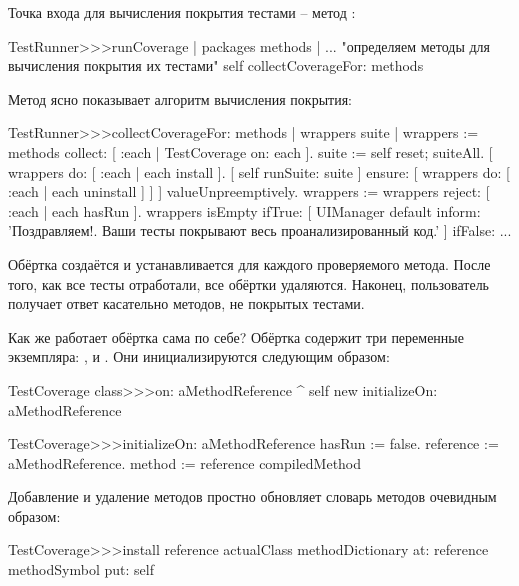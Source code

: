 \documentclass[a4paper,10pt,twoside]{book}
\begin{document}
{%
Точка входа для вычисления покрытия тестами -- метод :
\begin{code}{}
TestRunner>>>runCoverage
	| packages methods |
	... "определяем методы для вычисления покрытия их тестами"
	self collectCoverageFor: methods
\end{code}

Метод  ясно показывает алгоритм вычисления покрытия:
\begin{code}{}
TestRunner>>>collectCoverageFor: methods
	| wrappers suite |
	wrappers := methods collect: [ :each | TestCoverage on: each ].
	suite := self
		reset;
		suiteAll.
	[ wrappers do: [ :each | each install ].
	  [ self runSuite: suite ] ensure: [ wrappers do: [ :each | each uninstall ] ] ] valueUnpreemptively.
	wrappers := wrappers reject: [ :each | each hasRun ].
	wrappers isEmpty 
		ifTrue: 
			[ UIManager default inform: 'Поздравляем!. Ваши тесты покрывают весь проанализированный код.' ]
		ifFalse: ...
\end{code}
Обёртка создаётся и устанавливается для каждого проверяемого метода.
После того, как все тесты отработали, все обёртки удаляются.
Наконец, пользователь получает ответ касательно методов, не покрытых тестами.

Как же работает обёртка сама по себе?
Обёртка  содержит три переменные экземпляра: ,  и .
Они инициализируются следующим образом:
\begin{code}{}
TestCoverage class>>>on: aMethodReference
	^ self new initializeOn: aMethodReference

TestCoverage>>>initializeOn: aMethodReference
	hasRun := false.
	reference := aMethodReference.
	method := reference compiledMethod
\end{code}

Добавление и удаление методов простно обновляет словарь методов очевидным образом:
\begin{code}{}
TestCoverage>>>install
	reference actualClass methodDictionary
		at: reference methodSymbol
		put: self


\end{code}}
\end{document}
